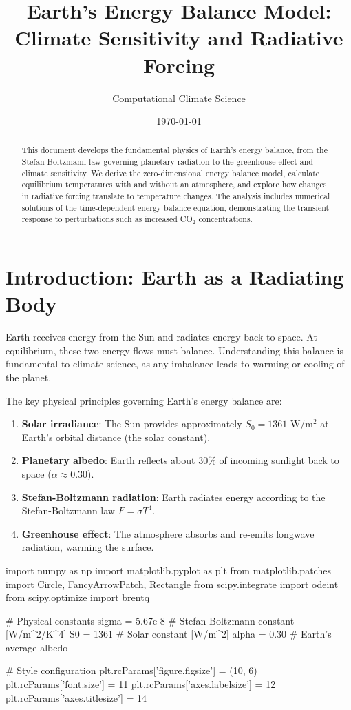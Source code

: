 \documentclass[11pt,a4paper]{article}
\title{Earth's Energy Balance Model:\\Climate Sensitivity and Radiative Forcing}
\author{Computational Climate Science}
\date{\today}
\begin{document}
\maketitle

\begin{abstract}
This document develops the fundamental physics of Earth's energy balance, from the Stefan-Boltzmann law governing planetary radiation to the greenhouse effect and climate sensitivity. We derive the zero-dimensional energy balance model, calculate equilibrium temperatures with and without an atmosphere, and explore how changes in radiative forcing translate to temperature changes. The analysis includes numerical solutions of the time-dependent energy balance equation, demonstrating the transient response to perturbations such as increased CO$_2$ concentrations.
\end{abstract}

\tableofcontents
\newpage

\section{Introduction: Earth as a Radiating Body}

Earth receives energy from the Sun and radiates energy back to space. At equilibrium, these two energy flows must balance. Understanding this balance is fundamental to climate science, as any imbalance leads to warming or cooling of the planet.

The key physical principles governing Earth's energy balance are:
\begin{enumerate}
    \item \textbf{Solar irradiance}: The Sun provides approximately $S_0 = 1361$ W/m$^2$ at Earth's orbital distance (the solar constant).
    \item \textbf{Planetary albedo}: Earth reflects about 30\% of incoming sunlight back to space ($\alpha \approx 0.30$).
    \item \textbf{Stefan-Boltzmann radiation}: Earth radiates energy according to the Stefan-Boltzmann law $F = \sigma T^4$.
    \item \textbf{Greenhouse effect}: The atmosphere absorbs and re-emits longwave radiation, warming the surface.
\end{enumerate}

\begin{pycode}
import numpy as np
import matplotlib.pyplot as plt
from matplotlib.patches import Circle, FancyArrowPatch, Rectangle
from scipy.integrate import odeint
from scipy.optimize import brentq

# Physical constants
sigma = 5.67e-8  # Stefan-Boltzmann constant [W/m^2/K^4]
S0 = 1361        # Solar constant [W/m^2]
alpha = 0.30     # Earth's average albedo

# Style configuration
plt.rcParams['figure.figsize'] = (10, 6)
plt.rcParams['font.size'] = 11
plt.rcParams['axes.labelsize'] = 12
plt.rcParams['axes.titlesize'] = 14
\end{pycode}
\end{document}
